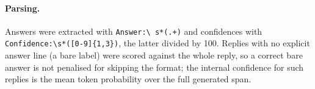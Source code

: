 \documentclass[11pt]{article}
\begin{document}
\paragraph{Parsing.} Answers were extracted with \texttt{Answer:\textbackslash
s*(.+)} and confidences with \texttt{Confidence:\textbackslash s*([0-9]\{1,3\})},
the latter divided by 100. Replies with no explicit answer line (a bare label)
were scored against the whole reply, so a correct bare answer is not penalised for
skipping the format; the internal confidence for such replies is the mean token
probability over the full generated span.



\end{document}
